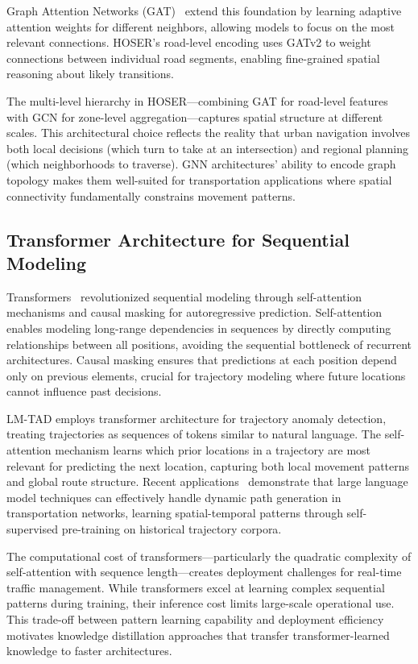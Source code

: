 Graph Attention Networks (GAT)~\cite{velickovicGraphAttentionNetworks2018} extend this foundation by learning adaptive attention weights for different neighbors, allowing models to focus on the most relevant connections. HOSER's road-level encoding uses GATv2 to weight connections between individual road segments, enabling fine-grained spatial reasoning about likely transitions.

The multi-level hierarchy in HOSER—combining GAT for road-level features with GCN for zone-level aggregation—captures spatial structure at different scales. This architectural choice reflects the reality that urban navigation involves both local decisions (which turn to take at an intersection) and regional planning (which neighborhoods to traverse). GNN architectures' ability to encode graph topology makes them well-suited for transportation applications where spatial connectivity fundamentally constrains movement patterns.

\subsection{Transformer Architecture for Sequential Modeling}
\label{sec:lit-transformer}

Transformers~\cite{vaswaniAttentionAllYou2023} revolutionized sequential modeling through self-attention mechanisms and causal masking for autoregressive prediction. Self-attention enables modeling long-range dependencies in sequences by directly computing relationships between all positions, avoiding the sequential bottleneck of recurrent architectures. Causal masking ensures that predictions at each position depend only on previous elements, crucial for trajectory modeling where future locations cannot influence past decisions.

LM-TAD employs transformer architecture for trajectory anomaly detection, treating trajectories as sequences of tokens similar to natural language. The self-attention mechanism learns which prior locations in a trajectory are most relevant for predicting the next location, capturing both local movement patterns and global route structure. Recent applications~\cite{liPathGenLLMLargeLanguage} demonstrate that large language model techniques can effectively handle dynamic path generation in transportation networks, learning spatial-temporal patterns through self-supervised pre-training on historical trajectory corpora.

The computational cost of transformers—particularly the quadratic complexity of self-attention with sequence length—creates deployment challenges for real-time traffic management. While transformers excel at learning complex sequential patterns during training, their inference cost limits large-scale operational use. This trade-off between pattern learning capability and deployment efficiency motivates knowledge distillation approaches that transfer transformer-learned knowledge to faster architectures.

